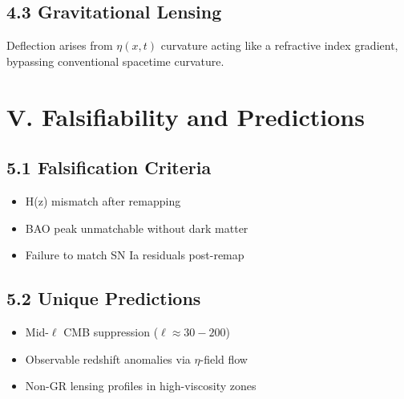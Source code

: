\documentclass[12pt]{article}
\begin{document}
\subsection*{4.3 Gravitational Lensing}
Deflection arises from \( \eta(x,t) \) curvature acting like a refractive index gradient, bypassing conventional spacetime curvature.

\section*{V. Falsifiability and Predictions}

\subsection*{5.1 Falsification Criteria}
\begin{itemize}
  \item H(z) mismatch after remapping
  \item BAO peak unmatchable without dark matter
  \item Failure to match SN Ia residuals post-remap
\end{itemize}

\subsection*{5.2 Unique Predictions}
\begin{itemize}
  \item Mid-\( \ell \) CMB suppression (\( \ell \approx 30-200 \))
  \item Observable redshift anomalies via \( \eta \)-field flow
  \item Non-GR lensing profiles in high-viscosity zones
\end{itemize}
\end{document}
